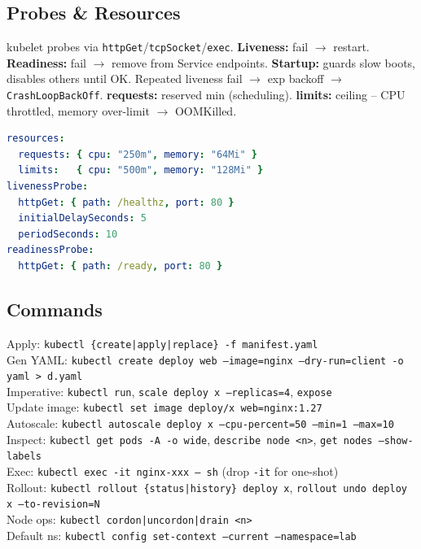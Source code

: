 \subsection{Probes \& Resources}
kubelet probes via \texttt{httpGet}/\texttt{tcpSocket}/\texttt{exec}. \textbf{Liveness:} fail $\rightarrow$ restart. \textbf{Readiness:} fail $\rightarrow$ remove from Service endpoints. \textbf{Startup:} guards slow boots, disables others until OK. Repeated liveness fail $\rightarrow$ exp backoff $\rightarrow$ \texttt{CrashLoopBackOff}. \textbf{requests:} reserved min (scheduling). \textbf{limits:} ceiling -- CPU throttled, memory over-limit $\rightarrow$ OOMKilled.
\begin{lstlisting}[language=yaml]
resources:
  requests: { cpu: "250m", memory: "64Mi" }
  limits:   { cpu: "500m", memory: "128Mi" }
livenessProbe:
  httpGet: { path: /healthz, port: 80 }
  initialDelaySeconds: 5
  periodSeconds: 10
readinessProbe:
  httpGet: { path: /ready, port: 80 }
\end{lstlisting}

\subsection{Commands}
Apply: \texttt{kubectl \{create|apply|replace\} -f manifest.yaml} \\
Gen YAML: \texttt{kubectl create deploy web --image=nginx --dry-run=client -o yaml > d.yaml} \\
Imperative: \texttt{kubectl run}, \texttt{scale deploy x --replicas=4}, \texttt{expose} \\
Update image: \texttt{kubectl set image deploy/x web=nginx:1.27} \\
Autoscale: \texttt{kubectl autoscale deploy x --cpu-percent=50 --min=1 --max=10} \\
Inspect: \texttt{kubectl get pods -A -o wide}, \texttt{describe node <n>}, \texttt{get nodes --show-labels} \\
Exec: \texttt{kubectl exec -it nginx-xxx -- sh} (drop \texttt{-it} for one-shot) \\
Rollout: \texttt{kubectl rollout \{status|history\} deploy x}, \texttt{rollout undo deploy x --to-revision=N} \\
Node ops: \texttt{kubectl cordon|uncordon|drain <n>} \\
Default ns: \texttt{kubectl config set-context --current --namespace=lab}

